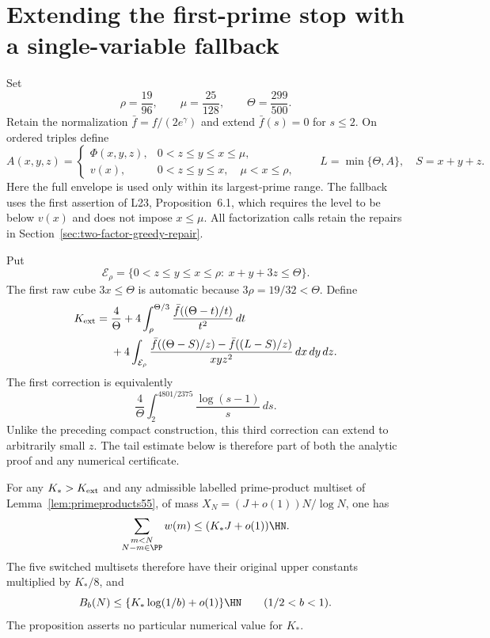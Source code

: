 \section{Extending the first-prime stop with a single-variable fallback}
\label{sec:extended-prefix-upper}

Set
\[
 \rho=\frac{19}{96},\qquad \mu=\frac{25}{128},\qquad
 \Theta=\frac{299}{500}.
\]
Retain the normalization $\bar f=f/(2e^\gamma)$ and extend
$\bar f(s)=0$ for $s\le2$. On ordered triples define
\[
 A(x,y,z)=
 \begin{cases}
 \Phi(x,y,z),&0<z\le y\le x\le\mu,\\
 v(x),&0<z\le y\le x,\quad\mu<x\le\rho,
 \end{cases}
 \qquad L=\min\{\Theta,A\},\quad S=x+y+z.
\]
Here the full envelope is used only within its largest-prime
range. The fallback uses the first assertion of L23,
Proposition~6.1, which requires the level to be below $v(x)$
and does not impose $x\le\mu$. All factorization calls retain
the repairs in Section~\ref{sec:two-factor-greedy-repair}.

Put
\[
 \mathcal E_\rho=\{0<z\le y\le x\le\rho:\ x+y+3z\le\Theta\}.
\]
The first raw cube $3x\le\Theta$ is automatic because
$3\rho=19/32<\Theta$. Define
\begin{align}
 K_{\rm ext}={}&\frac4\Theta+
 4\int_\rho^{\Theta/3}
          \frac{\bar f((\Theta-t)/t)}{t^2}\,dt\notag\\
 &+4\int_{\mathcal E_\rho}
 \frac{\bar f((\Theta-S)/z)-\bar f((L-S)/z)}{xyz^2}
                  \,dx\,dy\,dz.
 \label{eq:extended-prefix-functional}
\end{align}
The first correction is equivalently
\[
 \frac4\Theta\int_2^{4801/2375}\frac{\log(s-1)}s\,ds.
\]
Unlike the preceding compact construction, this third correction
can extend to arbitrarily small $z$. The tail estimate below is
therefore part of both the analytic proof and any numerical certificate.

\begin{proposition}
\label{prop:extended-prefix-upper}
For any $K_*>K_{\rm ext}$ and any admissible labelled prime-product
multiset of Lemma~\ref{lem:primeproducts55}, of mass
$X_N=(J+o(1))N/\log N$, one has
\[
 \sum_{\substack{m<N\\N-m\in\PP}}w(m)
              \le(K_*J+o(1))\HN.
\]
The five switched multisets therefore have their original upper
constants multiplied by $K_*/8$, and
\[
 B_b(N)\le\{K_*\log(1/b)+o(1)\}\HN\qquad(1/2<b<1).
\]
The proposition asserts no particular numerical value for $K_*$.
\end{proposition}

